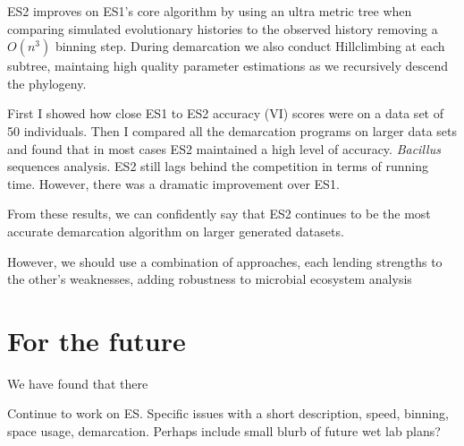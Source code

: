 ES2 improves on ES1's core algorithm by using an ultra metric tree when comparing simulated evolutionary histories to the observed history removing a $O(n^3)$ binning step.
During demarcation we also conduct Hillclimbing at each subtree, maintaing high quality parameter estimations as we recursively descend the phylogeny.

First I showed how close ES1 to ES2 accuracy (VI) scores were on a data set of 50 individuals.
Then I compared all the demarcation programs on larger data sets and found that in most cases ES2 maintained a high level of accuracy.
\emph{Bacillus} sequences analysis.
ES2 still lags behind the competition in terms of running time.
However, there was a dramatic improvement over ES1.

From these results, we can confidently say that ES2 continues to be the most accurate demarcation algorithm on larger generated datasets.

However, we should use a combination of approaches, each lending strengths to the other's weaknesses, adding robustness to microbial ecosystem analysis~\cite{bohannan2003new}

\section{For the future}
We have found that there 

Continue to work on ES.
Specific issues with a short description, speed, binning, space usage, demarcation.
Perhaps include small blurb of future wet lab plans?